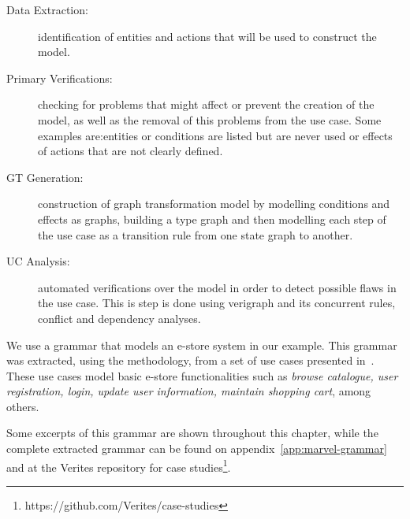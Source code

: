 \begin{description}
  \item[Data Extraction:] identification of entities and actions that will be used to construct the model.

  \item[Primary Verifications:] checking for problems that might affect or prevent the creation of the model, as well as the removal of this problems from the use case. Some examples are:entities or conditions are listed but are never used or effects of actions that are not clearly defined.

  \item[GT Generation:] construction of graph transformation model by modelling conditions and effects as graphs, building a type graph and then modelling each step of the use case as a transition rule from one state graph to another.

  \item[UC Analysis:] automated verifications over the model in order to detect possible flaws in the use case. This is step is done using verigraph and its concurrent rules, conflict and dependency analyses.
\end{description}

We use a grammar that models an e-store system in our example. This grammar was extracted, using the methodology, from a set of use cases presented in~\cite{Goins2007}. These use cases model basic e-store functionalities such as \emph{browse catalogue, user registration, login, update user information, maintain shopping cart}, among others.

Some excerpts of this grammar are shown throughout this chapter, while the complete extracted grammar can be found on appendix~\ref{app:marvel-grammar} and at the Verites repository for case studies\footnote{https://github.com/Verites/case-studies}.

